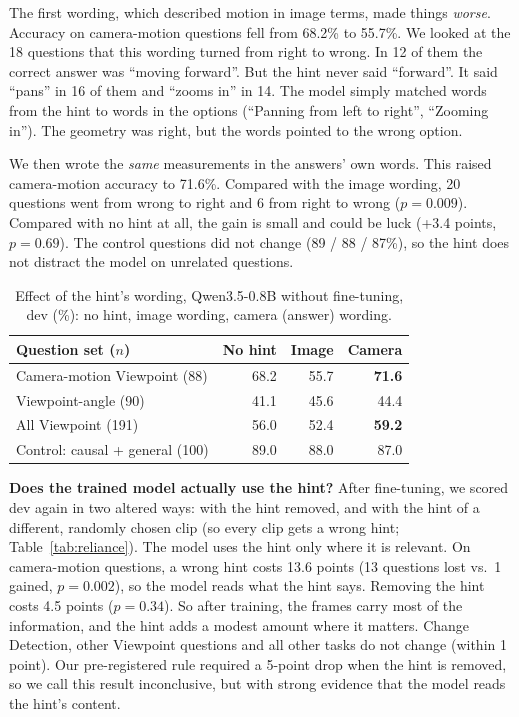 The first wording, which described motion in image terms, made things
\emph{worse}. Accuracy on camera-motion questions fell from 68.2\% to
55.7\%. We looked at the 18 questions that this wording turned from right
to wrong. In 12 of them the correct answer was ``moving forward''. But the
hint never said ``forward''. It said ``pans'' in 16 of them and ``zooms
in'' in 14. The model simply matched words from the hint to words in the
options (``Panning from left to right'', ``Zooming in''). The geometry was
right, but the words pointed to the wrong option.

We then wrote the \emph{same} measurements in the answers' own words. This
raised camera-motion accuracy to 71.6\%. Compared with the image wording,
20 questions went from wrong to right and 6 from right to wrong
($p{=}0.009$). Compared with no hint at all, the gain is small and could be
luck (+3.4 points, $p{=}0.69$). The control questions did not change (89 /
88 / 87\%), so the hint does not distract the model on unrelated
questions.

\begin{table}[t]
\centering
\caption{Effect of the hint's wording, Qwen3.5-0.8B without fine-tuning, dev
(\%): no hint, image wording, camera (answer) wording.}
\label{tab:cue}
\footnotesize
\begin{tabular}{@{}lrrr@{}}
\toprule
Question set ($n$) & No hint & Image & Camera \\
\midrule
Camera-motion Viewpoint (88) & 68.2 & 55.7 & \textbf{71.6} \\
Viewpoint-angle (90) & 41.1 & 45.6 & 44.4 \\
All Viewpoint (191) & 56.0 & 52.4 & \textbf{59.2} \\
Control: causal + general (100) & 89.0 & 88.0 & 87.0 \\
\bottomrule
\end{tabular}
\end{table}

\textbf{Does the trained model actually use the hint?} After fine-tuning,
we scored dev again in two altered ways: with the hint removed, and with
the hint of a different, randomly chosen clip (so every clip gets a wrong
hint; Table~\ref{tab:reliance}). The model uses the hint only where it is
relevant. On camera-motion questions, a wrong hint costs 13.6 points (13
questions lost vs.\ 1 gained, $p{=}0.002$), so the model reads what
the hint says. Removing the hint costs 4.5 points ($p{=}0.34$). So after
training, the frames carry most of the information, and the hint adds a
modest amount where it matters. Change Detection, other Viewpoint questions
and all other tasks do not change (within 1 point). Our pre-registered rule
required a 5-point drop when the hint is removed, so we call this result
inconclusive, but with strong evidence that the model reads the hint's
content.

